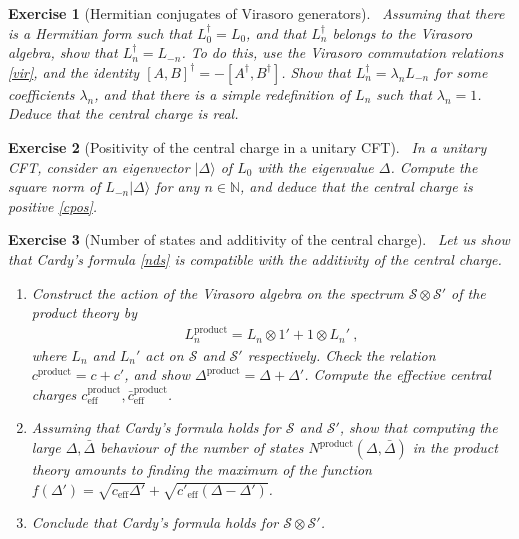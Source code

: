 \documentclass[12pt, a4paper, notitlepage, twoside]{report}
\numberwithin{equation}{section}
\theoremstyle{break}
\newtheorem{exo}{Exercise}[chapter]
\begin{document}
\begin{exo}[Hermitian conjugates of Virasoro generators]
 ~\label{exolnd}
Assuming that there is a Hermitian form such that $L_0^\dagger = L_0$, and that $L_n^\dagger$ belongs to the Virasoro algebra, show that $L_n^\dagger = L_{-n}$. To do this, use the Virasoro commutation relations \eqref{vir}, and the identity $[A,B]^\dagger = -[A^\dagger, B^\dagger]$. Show that $L_n^\dagger = \lambda_n L_{-n}$ for some coefficients $\lambda_n$, and that there is a simple redefinition of $L_n$ such that $\lambda_n=1$. Deduce that the central charge is real.
\end{exo}

\begin{exo}[Positivity of the central charge in a unitary CFT]
 ~\label{exocp}
In a unitary CFT, consider an eigenvector $|\Delta\rangle$ of $L_0$ with the eigenvalue $\Delta$. Compute the square norm of $L_{-n}|\Delta\rangle$ for any $n\in\mathbb{N}$, and deduce that the central charge is positive \eqref{cpos}.
\end{exo}

\begin{exo}[Number of states and additivity of the central charge]
 ~\label{exoacf} 
Let us show that Cardy's formula \eqref{nds} is compatible with the additivity of the central charge.
\begin{enumerate}
 \item Construct the action of the Virasoro algebra on the spectrum $\mathcal{S}\otimes \mathcal{S}'$ of the product theory by 
\begin{align}
 L_n^\text{product} = L_n\otimes 1' + 1\otimes L_n'\ ,
\end{align}
where $L_n$ and $L_n'$ act on $\mathcal{S}$ and $\mathcal{S}'$ respectively.
Check the relation $c^\text{product} = c+c'$, and show $\Delta^\text{product} = \Delta+\Delta'$.
Compute the effective central charges $c^\text{product}_\text{eff}, \bar c^\text{product}_\text{eff}$.
\item 
Assuming that Cardy's formula holds for $\mathcal{S}$ and $\mathcal{S}'$, show that computing the large $\Delta,\bar\Delta$ behaviour of the number of states $N^\text{product}(\Delta,\bar\Delta)$ in the product theory amounts to finding the maximum of the function $f(\Delta') = \sqrt{c_\text{eff}\Delta'} +\sqrt{c'_\text{eff}(\Delta-\Delta')}$.
\item
Conclude that Cardy's formula holds for $\mathcal{S}\otimes \mathcal{S}'$.
\end{enumerate}
\end{exo}
\end{document}
